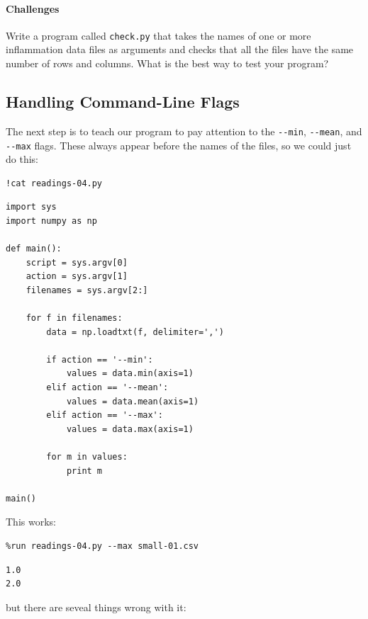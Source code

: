 \documentclass{book}
\begin{document}
\mbox{}\paragraph{Challenges}

\begin{swcenumerate}
\item
  Write a program called \texttt{check.py} that takes the names of one
  or more inflammation data files as arguments and checks that all the
  files have the same number of rows and columns. What is the best way
  to test your program?
\end{swcenumerate}

\subsection{Handling Command-Line Flags}

The next step is to teach our program to pay attention to the
\texttt{-{}-min}, \texttt{-{}-mean}, and \texttt{-{}-max} flags. These
always appear before the names of the files, so we could just do this:

\begin{verbatim}
!cat readings-04.py
\end{verbatim}

\begin{verbatim}
import sys
import numpy as np

def main():
    script = sys.argv[0]
    action = sys.argv[1]
    filenames = sys.argv[2:]

    for f in filenames:
        data = np.loadtxt(f, delimiter=',')

        if action == '--min':
            values = data.min(axis=1)
        elif action == '--mean':
            values = data.mean(axis=1)
        elif action == '--max':
            values = data.max(axis=1)

        for m in values:
            print m

main()
\end{verbatim}

This works:

\begin{verbatim}
%run readings-04.py --max small-01.csv
\end{verbatim}

\begin{verbatim}
1.0
2.0
\end{verbatim}

but there are seveal things wrong with it:
\end{document}
